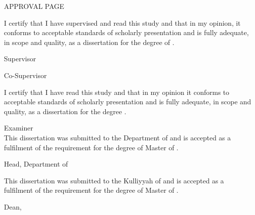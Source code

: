 \documentclass[12pt, a4paper]{memoir}
\begin{document}
\thispagestyle{empty}

\begin{Large}
\begin{center}
\MakeUppercase{Approval Page}
\end{center}
\end{Large}
\vspace{24pt}
I certify that I have supervised and read this study and that in my opinion, it 
conforms to acceptable standards of scholarly presentation and is fully 
adequate, in scope and quality, as a dissertation for the degree of \myDegree.
\\[24pt]

\hfill \makebox[2in]{\dotfill}

\hfill \mySupervisor

\hfill Supervisor
\\[24pt]


\ifdefined\myCoSupervisor
  \hfill \makebox[2in]{\dotfill}

  \hfill \myCoSupervisor

  \hfill Co-Supervisor\\[24pt]
\fi

\noindent I certify that I have read this study and that in my opinion it 
conforms to acceptable standards of scholarly presentation and is fully 
adequate, in scope and quality, as a dissertation for the degree 
\myDegree.\\[24pt]

\hfill \makebox[2in]{\dotfill}

\hfill \myExaminer

\hfill Examiner\\[24pt]

\noindent This dissertation was submitted to the Department of \myDepartment 
and is 
accepted as a fulfilment of the requirement for the degree of Master of 
\mySubject.\\[24pt]

\hfill \makebox[2in]{\dotfill}

\hfill \myDepartmentHead

\hfill Head, Department of \myDepartment\\[24pt]

\ifdefined\myCoSupervisor
\newpage
\fi

\noindent This dissertation was submitted to the Kulliyyah of \myKulliyah and 
is accepted as a fulfilment of the requirement for the degree of Master of 
\mySubject.\\[24pt]

\hfill \makebox[2in]{\dotfill}

\hfill \myKulliyahDean

\hfill Dean, \myKulliyah\\[24pt]
\end{document}
